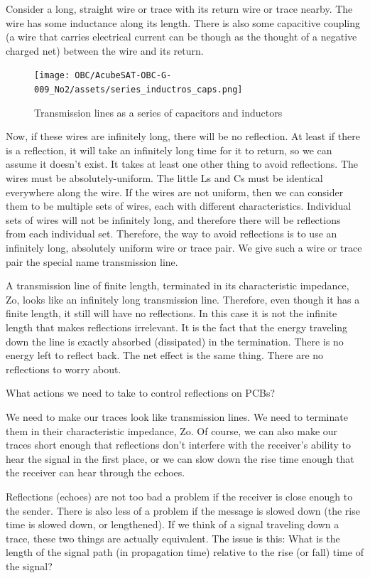 \documentclass[final]{cubedoc}
\begin{document}
	Consider a long, straight wire or trace with its return wire or trace nearby. The wire has some inductance along its length. There is also some capacitive coupling (a wire that carries electrical current can be though as the thought of a negative charged net) between the wire and its return.
	
	\begin{figure}[h!]
		\centering
		\texttt{[image: OBC/AcubeSAT-OBC-G-009\_No2/assets/series\_inductros\_caps.png]}
		\caption{Transmission lines as a series of capacitors and inductors}
		\label{fig:my_label}
	\end{figure}
	
	Now, if these wires are infinitely long, there will be no reflection. At least if there is a reflection, it will take an infinitely long time for it to return, so we can assume it doesn't exist. It takes at least one other thing to avoid reflections. The wires must be absolutely-uniform. The little Ls and Cs must be identical everywhere along the wire. If the wires are not uniform, then we can consider them to be multiple sets of wires, each with different characteristics. Individual sets of wires will not be infinitely long, and therefore there will be reflections from each individual set. Therefore, the way to avoid reflections is to use an infinitely long, absolutely uniform wire or trace pair. We give such a wire or trace pair the special name transmission line.
	
	A transmission line of finite length, terminated in its characteristic impedance, Zo, looks like an infinitely long transmission line. Therefore, even though it has a finite length, it still will have no reflections. In this case it is not the infinite length that makes reflections irrelevant. It is the fact that the energy traveling down the line is exactly absorbed (dissipated) in the termination. There is no energy left to reflect back. The net effect is the same thing. There are no reflections to worry about.
	
	
	What actions we need to take to control reflections on PCBs?
	
	We need to make our traces look like transmission lines. We need to terminate them in their characteristic impedance, Zo. Of course, we can also make our traces short enough that reflections don't interfere with the receiver's ability to hear the signal in the first place, or we can slow down the rise time enough that the receiver can hear through the echoes. 
	
	Reflections (echoes) are not too bad a problem if the receiver is close enough to the sender. There is also less of a problem if the message is slowed down (the rise time is slowed down, or lengthened). If we think of a signal traveling down a trace, these two things are actually equivalent. The issue is this: What is the length of the signal path (in propagation time) relative to the rise (or fall) time of the signal?
	
\end{document}
